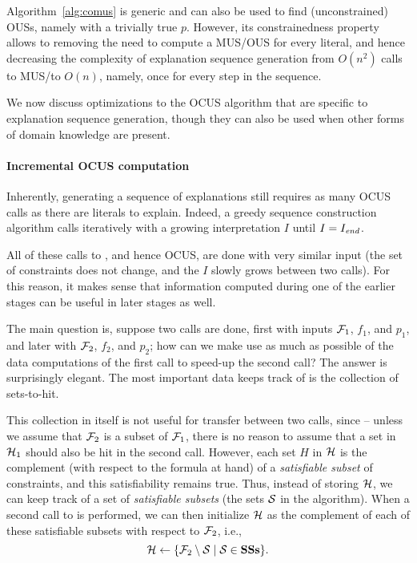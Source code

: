 Algorithm~\ref{alg:comus} is generic and can also be used to find (unconstrained) OUSs, namely with a trivially true $p$.
However, its constrainedness property allows to removing the need to compute a MUS/OUS for every literal, and hence decreasing the complexity of explanation sequence generation from $O(n^2)$ calls to MUS/\omus to $O(n)$, namely, once for every step in the sequence.


We now discuss optimizations to the OCUS algorithm that are specific to explanation sequence generation, though they can also be used when other forms of domain knowledge are present. 
 
\paragraph{Incremental OCUS computation}
Inherently, generating a sequence of explanations still requires as many OCUS calls as there are literals to explain. 
Indeed, a greedy sequence construction algorithm %
calls \onestepo iteratively with a growing interpretation $I$ until $I=I_\mathit{end} $.

All of these calls to \onestepo, and hence OCUS, are done with very similar input (the set of constraints does not change, and the $I$ slowly grows between two calls). For this reason, it makes sense that information computed during one of the earlier stages can be useful in later stages as well. 

The main question is, suppose two \comus calls are done, first with inputs $\mathcal{F} _1$, $f_1$, and $p_1$, and later with $\mathcal{F} _2$, $f_2$, and $p_2$; how can we make use as much as possible of the data computations of the first call to speed-up the second call? The answer is surprisingly elegant. The most important data \comus keeps track of  is the collection \setstohit of sets-to-hit.

This collection in itself is not useful for transfer between two calls, since -- unless we assume that $\mathcal{F} _2$ is a subset of $\mathcal{F} _1$, there is no reason to assume that a set in $\mathcal{H}_1$ should also be hit in the second call. 
However, each set $H$ in $\mathcal{H}$ is the complement (with respect to the formula at hand) of a \emph{satisfiable subset} of constraints, and this satisfiability remains true. 
Thus, instead of storing $\mathcal{H}$, we can keep track of a set \satsets of \emph{satisfiable subsets} (the sets $\mathcal{S}$ in the \comus algorithm). 
When a second call to \comus is performed, we can then initialize $\mathcal{H}$ as the complement of each of these satisfiable subsets with respect to $\mathcal{F} _2$, i.e., \[\mathcal{H}\gets \{\mathcal{F} _2\setminus \mathcal{S}\mid \mathcal{S}\in \mathbf{SSs}\}.\]

